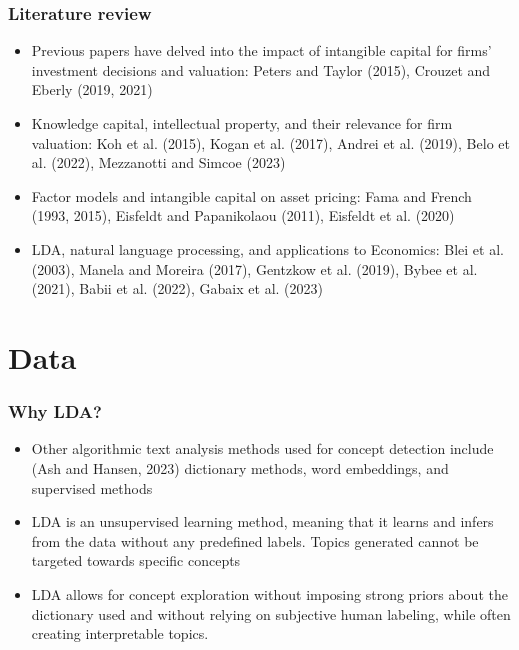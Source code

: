 \documentclass{beamer}
\newcommand{\insertfigurenoffo}[3]{
\begin{figure}[h!]
  \centering
  \texttt{[image: \#1]}
  \caption{#2}
  \label{fig:#1}
\end{figure}
}
\begin{document}
\begin{frame}
\frametitle{Literature review}
\small 
\begin{itemize}
\item Previous papers have delved into the impact of intangible capital for firms’ investment decisions and valuation: Peters and Taylor (2015), Crouzet and Eberly (2019, 2021)
\item Knowledge capital, intellectual property, and their relevance for firm valuation: Koh et al. (2015), Kogan et al. (2017), Andrei et al. (2019), Belo et al. (2022), Mezzanotti and Simcoe (2023)
\item Factor models and intangible capital on asset pricing: Fama and French (1993, 2015), Eisfeldt and Papanikolaou (2011), Eisfeldt et al. (2020)
\item LDA, natural language processing, and applications to Economics: Blei et al. (2003), Manela and Moreira (2017), Gentzkow et al. (2019), Bybee et al. (2021), Babii et al. (2022), Gabaix et al. (2023)

\end{itemize}
\end{frame}

\section{Data}
\begin{frame}
\frametitle{Why LDA?}
\begin{itemize}
\item Other algorithmic text analysis methods used for concept detection include (Ash and Hansen, 2023) dictionary methods, word embeddings, and supervised methods
\item LDA is an unsupervised learning method, meaning that it learns and infers from the data without any predefined labels. Topics generated cannot be targeted towards specific concepts
\item LDA allows for concept exploration without imposing strong priors about the dictionary used and without relying on subjective human labeling, while often creating interpretable topics. \hyperlink{slide:lda}{} \hyperlink{slide:approach}{}

\end{itemize}
\end{frame}

 
\end{document}
